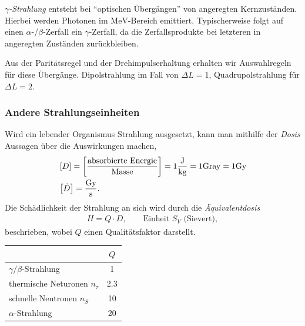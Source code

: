 \textit{$\gamma$-Strahlung} entsteht bei ``optischen Übergängen'' von
angeregten Kernzuständen. Hierbei werden Photonen im $\mathrm{MeV}$-Bereich
emittiert. Typischerweise folgt auf einen $\alpha$-/$\beta$-Zerfall ein
$\gamma$-Zerfall, da die Zerfallsprodukte bei letzteren in angeregten
Zuständen zurückbleiben.

Aus der Paritätsregel und der Drehimpulserhaltung erhalten wir Auswahlregeln
für diese Übergänge. Dipolstrahlung im Fall von $\Delta L = 1$,
Quadrupolstrahlung für $\Delta L = 2$.

\subsubsection{Andere Strahlungseinheiten}
Wird ein lebender Organismus Strahlung ausgesetzt, kann man mithilfe der
\emph{Dosis} Aussagen über die Auswirkungen machen,
\begin{align*}
&\left[D\right] = \left[\frac{\text{absorbierte Energie}}{\text{Masse}}\right] = 1
\frac{\mathrm{J}}{\mathrm{kg}} = 1 \mathrm{Gray} = 1 \mathrm{Gy}\\
&\left[\dot{D}\right] = \frac{\mathrm{Gy}}{\mathrm{s}}.
\end{align*}
Die Schädlichkeit der Strahlung an sich wird durch die \emph{Äquivalentdosis}
\begin{align*}
H=Q\cdot D,\qquad \text{Einheit }S_V\text{ (Sievert)},
\end{align*}
beschrieben, wobei $Q$ einen Qualitätsfaktor darstellt.

\begin{tabular}[h]{l|c}
 & $Q$\\\hline
 $\gamma/\beta$-Strahlung & 1\\
 thermische Neturonen $n_\tau$ & 2.3\\
 schnelle Neutronen $n_S$ & 10\\
 $\alpha$-Strahlung & 20
\end{tabular}
